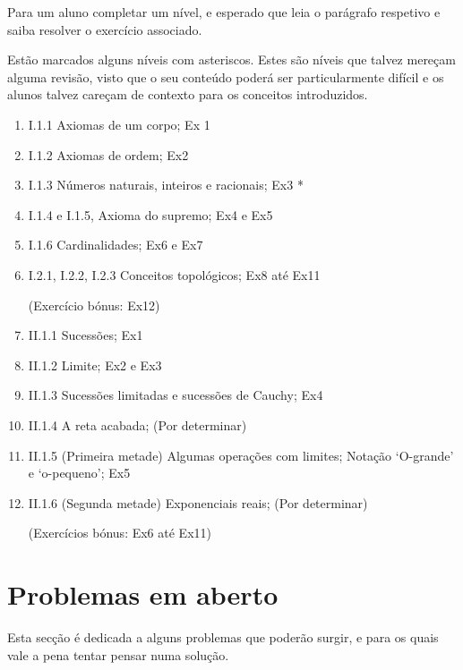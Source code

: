 \documentclass{article}
\begin{document}
	Para um aluno completar um nível, e esperado que leia o parágrafo respetivo e saiba resolver o exercício associado.
	
	Estão marcados alguns níveis com asteriscos. Estes são níveis que talvez mereçam alguma revisão, visto que o seu conteúdo poderá ser particularmente difícil e os alunos talvez careçam de contexto para os conceitos introduzidos.
	
	\begin{enumerate}
	\item I.1.1 Axiomas de um corpo; Ex 1
	
	\item I.1.2 Axiomas de ordem; Ex2
	
	\item I.1.3 Números naturais, inteiros e racionais; Ex3 *
	
	\item I.1.4 e I.1.5, Axioma do supremo; Ex4 e Ex5
	
	\item I.1.6 Cardinalidades; Ex6 e Ex7
	
	\item I.2.1, I.2.2, I.2.3 Conceitos topológicos; Ex8 até Ex11
	
	(Exercício bónus: Ex12)
	
	\item II.1.1 Sucessões; Ex1
	
	\item II.1.2 Limite; Ex2 e Ex3
	
	\item II.1.3 Sucessões limitadas e sucessões de Cauchy; Ex4
	
	\item II.1.4 A reta acabada; (Por determinar)
	
	\item II.1.5 (Primeira metade) Algumas operações com limites; Notação `O-grande' e `o-pequeno'; Ex5
	
	\item II.1.6 (Segunda metade) Exponenciais reais; (Por determinar)
	
	(Exercícios bónus: Ex6 até Ex11)
	\end{enumerate}
	
	\section{Problemas em aberto}
	
	Esta secção é dedicada a alguns problemas que poderão surgir, e para os quais vale a pena tentar pensar numa solução.
	
\end{document}
